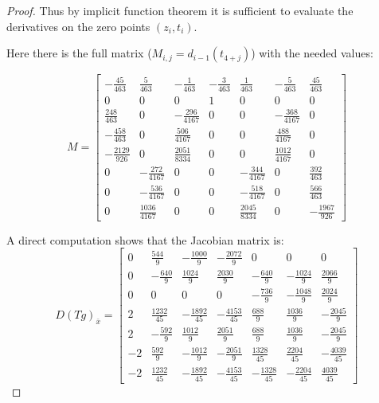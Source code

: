 \documentclass[9pt]{article}
\begin{document}
\begin{proof}
  Thus by implicit function theorem it is sufficient to evaluate the derivatives on the zero points $(z_i, t_i)$.

  Here there is the full matrix ($M_{i,j} = d_{i-1}(t_{4+j})$) with the needed values:

\[
 M= \left[
\begin{matrix}

  - \frac{45}{463} & \frac{5}{463} & - \frac{1}{463} & - \frac{3}{463} & \frac{1}{463} & - \frac{5}{463} & \frac{45}{463}\\
  0&0&0& 1 &0&0&0 \\

\frac{248}{463} & 0 & - \frac{296}{4167} & 0 & 0 & - \frac{368}{4167} & 0\\

- \frac{458}{463} & 0 & \frac{506}{4167} & 0 & 0 & \frac{488}{4167} & 0\\

- \frac{2129}{926} & 0 & \frac{2051}{8334} & 0 & 0 & \frac{1012}{4167} & 0\\

0 & - \frac{272}{4167} & 0 & 0 & - \frac{344}{4167} & 0 & \frac{392}{463}\\

0 & - \frac{536}{4167} & 0 & 0 & - \frac{518}{4167} & 0 & \frac{566}{463}\\

0 & \frac{1036}{4167} & 0 & 0 & \frac{2045}{8334} & 0 & - \frac{1967}{926}
\end{matrix}
\right]
\]


A direct computation shows that the Jacobian matrix is:
\[
  D(Tg)_{\bar x} =
\left[
  \begin{matrix}
    0 & \frac{544}{9} & - \frac{1000}{9} & - \frac{2072}{9} & 0 & 0 & 0\\
    0 & - \frac{640}{9} & \frac{1024}{9} & \frac{2030}{9} & - \frac{640}{9} & - \frac{1024}{9} & \frac{2066}{9}\\
    0 & 0 & 0 & 0 & - \frac{736}{9} & - \frac{1048}{9} & \frac{2024}{9}\\
    2 & \frac{1232}{45} & - \frac{1892}{45} & - \frac{4153}{45} & \frac{688}{9} & \frac{1036}{9} & - \frac{2045}{9}\\
    2 & - \frac{592}{9} & \frac{1012}{9} & \frac{2051}{9} & \frac{688}{9} & \frac{1036}{9} & - \frac{2045}{9}\\
    -2 & \frac{592}{9} & - \frac{1012}{9} & - \frac{2051}{9} & \frac{1328}{45} & \frac{2204}{45} & - \frac{4039}{45}\\
    -2 & \frac{1232}{45} & - \frac{1892}{45} & - \frac{4153}{45} & - \frac{1328}{45} & - \frac{2204}{45} & \frac{4039}{45}
      \end{matrix}
    \right]
  \]


\end{proof}
\end{document}
